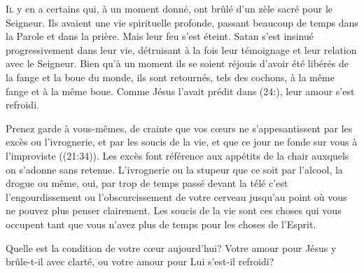 \dvrule







\lettrine{I}{l} y en a certains qui, à un moment donné,
 ont brûlé d'un zèle sacré pour le Seigneur.
 Ils avaient une vie spirituelle profonde, passant beaucoup de temps
 dans la Parole et dans la prière. Mais leur feu s'est éteint.
 Satan s'est insinué progressivement dans leur vie, détruisant à la fois
 leur témoignage et leur relation avec le Seigneur.
 Bien qu'à un moment ils se soient réjouis d'avoir été libérés
 de la fange et la boue du monde, ils sont retournés, tels des cochons,
 à la même fange et à la même boue.
 Comme Jésus l'avait prédit dans (24:),
 leur amour s'est refroidi. 


\Og Prenez garde à vous-mêmes, de crainte que vos c\oe{}urs
 ne s'appesantissent par les excès ou l'ivrognerie,
 et par les soucis de la vie, et que ce jour ne fonde sur vous
 à l'improviste \Fg{} ((21:34)).
 Les excès font référence aux appétits de la chair auxquels
 on s'adonne sans retenue. L'ivrognerie ou la stupeur
 \ocadr que ce soit par l'alcool, la drogue ou même, oui,
 par trop de temps passé devant la télé \fcadr{} c'est l'engourdissement
 ou l'obscurcissement de votre cerveau jusqu'au point
 où vous ne pouvez plus penser clairement.
 Les soucis de la vie sont ces choses qui vous occupent
 tant que vous n'avez plus de temps pour les choses de l'Esprit. 

Quelle est la condition de votre c\oe{}ur aujourd'hui?
 Votre amour pour Jésus y brûle-t-il avec clarté,
 ou votre amour pour Lui s'est-il refroidi? 

\dvrule




